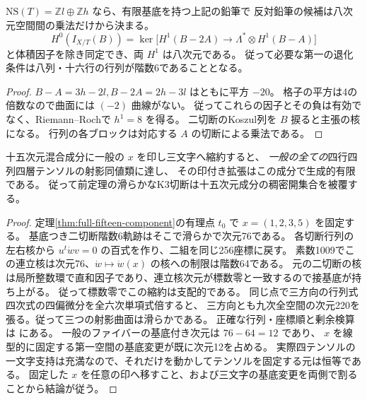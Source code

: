\begin{proposition}\label{prop:finite-marked-eight-determinant}
$\mathrm{NS}(T)=\mathbb Z l\oplus\mathbb Z h$ なら、有限基底を持つ上記の鉛筆で
反対鉛筆の候補は八次元空間間の乗法だけから決まる。
\[
 H^0(I_{X/T}(B))=\ker\big[H^1(B-2A)\longrightarrow
                 \Lambda^*\otimes H^1(B-A)\big]
\]
と体積因子を除き同定でき、両 $H^1$ は八次元である。
従って必要な第一の退化条件は八列・十六行の行列が階数6であることとなる。
\end{proposition}
\begin{proof}
$B-A=3h-2l, B-2A=2h-3l$ はともに平方 $-20$。
格子の平方は4の倍数なので曲面には $(-2)$ 曲線がない。
従ってこれらの因子とその負は有効でなく、Riemann--Rochで $h^1=8$ を得る。
二切断のKoszul列を $B$ 捩ると主張の核になる。
行列の各ブロックは対応する $A$ の切断による乗法である。
\end{proof}

\begin{theorem}\label{thm:dominant-four-by-four-by-four-slice}
十五次元混合成分に一般の $x$ を印し三文字へ縮約すると、
\emph{一般の全ての}四行四列四層テンソルの射影同値類に達し、
その印付き拡張はこの成分で生成的有限である。
従って前定理の滑らかなK3切断は十五次元成分の稠密開集合を被覆する。
\end{theorem}
\begin{proof}
定理\ref{thm:full-fifteen-component}の有理点 $t_0$ で $x=(1,2,3,5)$ を固定する。
基底つき二切断階数6軌跡はそこで滑らかで次元76である。
各切断行列の左右核から $u^t\dot w v=0$ の百式を作り、二組を同じ256座標に戻す。
素数1009でこの連立核は次元76、$\dot w\mapsto\dot w(x)$ の核への制限は階数64である。
元の二切断の核は局所整数環で直和因子であり、連立核次元が標数零と一致するので接基底が持ち上がる。
従って標数零でこの縮約は支配的である。
同じ点で三方向の行列式四次式の四偏微分を全六次単項式倍すると、
三方向とも九次全空間の次元220を張る。従って三つの射影曲面は滑らかである。
正確な行列・座標順と剰余検算は  にある。
一般のファイバーの基底付き次元は $76-64=12$ であり、
$x$ を線型的に固定する第一空間の基底変更が既に次元12を占める。
実際四テンソルの一文字支持は充満なので、それだけを動かしてテンソルを固定する元は恒等である。
固定した $x$ を任意の印へ移すこと、および三文字の基底変更を両側で割ることから結論が従う。
\end{proof}
